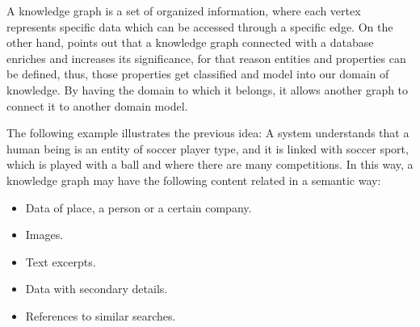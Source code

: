 A knowledge graph is a set of organized information, where each vertex 
represents specific data which can be accessed through a specific edge. 
On the other hand, \cite{Saorin} points out that a knowledge graph connected 
with a database enriches and increases its
significance, for that reason entities and properties can be defined, thus, 
those properties get classified and model  into our domain of knowledge. 
By having the domain to which it belongs, it allows another graph to connect it 
to another domain model.

The following example illustrates the previous idea: A system understands that 
a human being is an entity of soccer player type, and it is linked with soccer 
sport, which is played with a ball and where there are many competitions. 
In this way, a knowledge graph may have the following content related in a 
semantic way:

\begin{itemize}
\item Data of place, a person or a certain company.
\item Images.
\item Text excerpts.
\item Data with secondary details.
\item References to similar searches.
\end{itemize}

